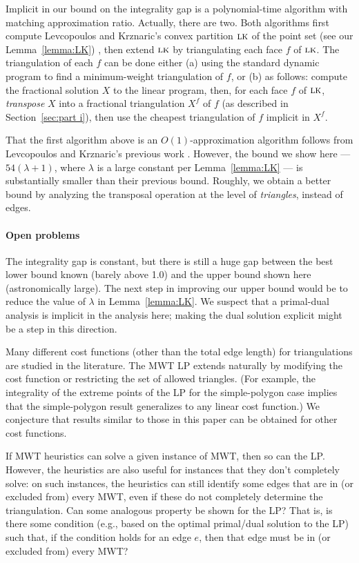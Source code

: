 \documentclass[final]{siamltex}
\newcommand{\transposal}[2]{{#1}^{#2}}
\newcommand{\LK}{\text{\sc lk}}
\newcommand{\edge}{e}
\newcommand{\face}{f}
\newcommand{\fracTriang}{X}
\begin{document}
Implicit in our bound on the integrality gap
is a polynomial-time algorithm with matching approximation ratio.
Actually, there are two.
Both algorithms first compute Levcopoulos and Krznaric's convex partition $\LK$
of the point set
(see our Lemma~\ref{lemma:LK}) \cite{krznaric1998quasi},
then extend $\LK$ by triangulating each face $\face$ of $\LK$.
The triangulation of each $\face$ can be done either 
(a) using the standard dynamic program to find a minimum-weight triangulation of $\face$,
or (b) as follows: compute the fractional solution $\fracTriang$ to the linear program,
then, for each face $\face$ of $\LK$,
{\em transpose} $\fracTriang$ into a fractional triangulation $\transposal{\fracTriang}{\face}$
of $\face$
(as described in Section~\ref{sec:part i}),
then use the cheapest triangulation of $\face$ implicit in $\transposal{\fracTriang}{\face}$.

That the first algorithm above is an $O(1)$-approximation algorithm
follows from Levcopoulos and Krznaric's previous work \cite{krznaric1998quasi}.
However, the bound we show here
--- $54(\lambda+1)$, where $\lambda$ is a large constant per Lemma~\ref{lemma:LK} ---
is substantially smaller 
than their previous bound.
Roughly, we obtain a better bound by analyzing the transposal operation 
at the level of {\em triangles}, instead of edges.

\paragraph{Open problems}
The integrality gap is constant,
but there is still a huge gap between the best lower bound known (barely above 1.0) and the upper bound shown here (astronomically large).
The next step in improving our upper bound
would be to reduce the value of $\lambda$ in Lemma~\ref{lemma:LK}.
We suspect that a primal-dual analysis is implicit in the analysis here; 
making the dual solution explicit might be a step in this direction.

Many different cost functions 
(other than the total edge length) for triangulations
are studied in the literature.
The MWT LP extends naturally
by modifying the cost function or restricting the set of allowed triangles.
(For example, the integrality of the extreme points of the LP for the simple-polygon case
implies that the simple-polygon result generalizes to any linear cost function.)
We conjecture that results similar to those in this paper can be obtained for other cost functions.

If MWT heuristics can solve a given instance of MWT, then so can the LP.
However, the heuristics are also useful for instances that they don't completely solve:
on such instances, the heuristics can still identify some edges that are in (or excluded from) 
every MWT, even if these do not completely determine the triangulation.
Can some analogous property be shown for the LP?
That is, is there some condition (e.g., based on the optimal primal/dual solution to the LP) such that,
if the condition holds for an edge $\edge$, then that edge must be in (or excluded from) every MWT?
\end{document}
